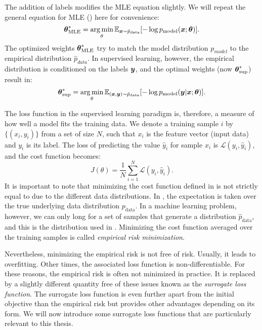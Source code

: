 The addition of labels modifies the MLE equation slightly. We will repeat the general equation for MLE () here for convenience:
\begin{equation}
    \boldsymbol{\theta}^*_{\text{MLE}} = \operatorname*{arg\,min}_\theta \mathbb{E}_{\boldsymbol{x}\sim \hat{p}_{\text{data}}} [- \log p_{\text{model}}(\boldsymbol{x};\boldsymbol{\theta})].
    \label{eq:mle2}
\end{equation}
The optimized weights $\boldsymbol{\theta}^*_{\text{MLE}}$ try to match the model distribution $p_{model}$ to the empirical distribution $\hat{p}_{data}$. In supervised learning, however, the empirical distribution is conditioned on the labels $\boldsymbol{y}$, and the optimal weights (now $\boldsymbol{\theta}^*_{\text{sup}}$) result in:
\begin{equation}
    \boldsymbol{\theta}^*_{\text{sup}} = \operatorname*{arg\,min}_\theta \mathbb{E}_{(\boldsymbol{x}, \boldsymbol{y})\sim \hat{p}_{\text{data}}} [- \log p_{\text{model}}(\boldsymbol{y}|\boldsymbol{x};\boldsymbol{\theta})].
    \label{eq:ml_supervised}
\end{equation}

The loss function in the supervised learning paradigm is, therefore, a measure of how well a model fits the training data. We denote a training sample $i$ by $\{(x_i, y_i)\}$ from a set of size $N$, such that $x_i$ is the feature vector (input data) and $y_i$ is its label. The loss of predicting the value $\hat{y}_i$ for sample $x_i$ is $\mathcal{L}(y_i, \hat{y}_i)$, and the cost function becomes:
\begin{equation}
    J(\theta) = \dfrac{1}{N}\sum_{i=1}^N \mathcal{L}(y_i, \hat{y}_i).
    \label{eq:cost_supervised}
\end{equation}
It is important to note that minimizing the cost function defined in  is not strictly equal to  due to the different data distributions. In , the expectation is taken over the true underlying data distribution $p_{\text{data}}$. In a machine learning problem, however, we can only long for a set of samples that generate a distribution $\hat{p}_{\text{data}}$, and this is the distribution used in . Minimizing the cost function averaged over the training samples is called \textit{empirical risk minimization}. 

Nevertheless, minimizing the empirical risk is not free of risk. Usually, it leads to overfitting. Other times, the associated loss function is non-differentiable. For these reasons, the empirical risk is often not minimized in practice. It is replaced by a slightly different quantity free of these issues known as the \textit{surrogate loss function}. The surrogate loss function is even further apart from the initial objective than the empirical risk but provides other advantages depending on its form. We will now introduce some surrogate loss functions that are particularly relevant to this thesis. 

